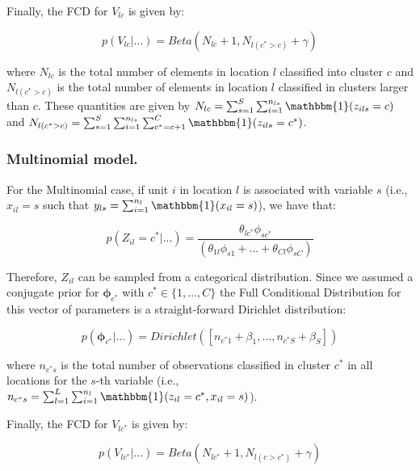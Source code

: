 \documentclass[article]{jss}
\begin{document}
Finally, the FCD for \(V_{lc}\) is given by:

\begin{equation}
p\left(V_{lc}|...\right) = Beta(N_{lc}+1,N_{l(c^{*}>c)}+\gamma)
    \label{eq:eq0008} 
\end{equation}

\noindent where \(N_{lc}\) is the total number of elements in location
\(l\) classified into cluster \(c\) and \(N_{l(c^{*}>c)}\) is the total
number of elements in location \(l\) classified in clusters larger than
\(c\). These quantities are given by
\(N_{lc}=\sum_{s=1}^{S}\sum_{i=1}^{n_{ls}}\mathbbm{1}(z_{ils}=c)\) and
\(N_{l(c^{*}>c)}=\sum_{s=1}^{S}\sum_{i=1}^{n_{ls}}\sum_{c^{*}=c+1}^{C}\mathbbm{1}(z_{ils}=c^{*})\).

\subsubsection{Multinomial model.}\label{multinomial-model.}

For the Multinomial case, if unit \(i\) in location \(l\) is associated
with variable \(s\) (i.e., \(x_{il}=s\) such that
\(y_{ls}=\sum_{i=1}^{n_{l}}\mathbbm{1}(x_{il}=s)\)), we have that:

\begin{equation}
p(Z_{il}=c^{*}|...)=\frac{\theta_{lc^{*}}\phi_{sc^{*}}}{\left(\theta_{1l}\phi_{s1}+\dots+\theta_{Cl}\phi_{sC}\right)}
    \label{eq:eq0009} 
\end{equation}

Therefore, \(Z_{il}\) can be sampled from a categorical distribution.
Since we assumed a conjugate prior for \(\boldsymbol\phi_{c^{*}}\) with
\(c^{*}\in\{1,\dots,C\}\) the Full Conditional Distribution for this
vector of parameters is a straight-forward Dirichlet distribution:

\begin{equation}
p(\boldsymbol\phi_{c^{*}}|...)=Dirichlet([n_{c^{*}1}+\beta_{1},\dots,n_{c^{*}S}+\beta_{S}])
    \label{eq:eq0010} 
\end{equation}

\noindent where \(n_{c^{*}s}\) is the total number of observations
classified in cluster \(c^{*}\) in all locations for the \(s\)-th
variable (i.e.,
\(n_{c^{*}s}=\sum_{l=1}^{L}\sum_{i=1}^{n_{l}}\mathbbm{1}(z_{il}=c^{*},x_{il}=s)\)).

Finally, the FCD for \(V_{lc^{*}}\) is given by:

\begin{equation}
  p(V_{lc^{*}}|...)=Beta(N_{lc^{*}}+1,N_{l(c>c^{*})} +\gamma)
    \label{eq:eq0011} 
\end{equation}
\end{document}
